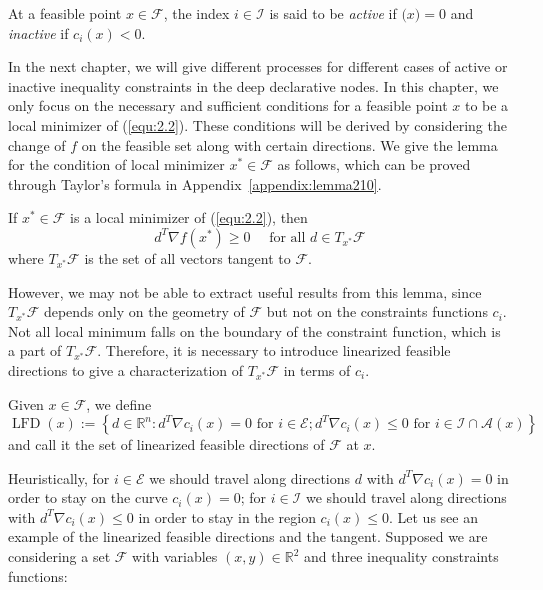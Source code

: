 \begin{defn}
    At a feasible point $x \in \mathscr{F}$, the index $i \in \mathscr{I}$ is said to be \emph{active} if $\mathscr(x) = 0$ and \emph{inactive} if $c_i(x) < 0$.  
\end{defn}
\par In the next chapter, we will give different processes for different cases of active or inactive inequality constraints in the deep declarative nodes. In this chapter, we only focus on the necessary and sufficient conditions for a feasible point $x$ to be a local minimizer of (\ref{equ:2.2}). These conditions will be derived by considering the change of $f$ on the feasible set along with certain directions. We give the lemma for the condition of local minimizer $x^* \in \mathscr{F}$ as follows, which can be proved through Taylor’s formula in Appendix~\ref{appendix:lemma210}.
\begin{lemma}
    \label{lemma:210}
    If $x^* \in \mathscr{F}$ is a local minimizer of (\ref{equ:2.2}), then
    $$
    d^{T} \nabla f\left(x^{*}\right) \geq 0 \quad \textrm { for all } d \in T_{x^{*}} \mathscr{F}
    $$
    where $T_{x^{*}} \mathscr{F}$ is the set of all vectors tangent to $\mathscr{F}$. 
\end{lemma}
\par However, we may not be able to extract useful results from this lemma, since $T_{x^{*}} \mathscr{F}$ depends only on the geometry of $\mathscr{F}$ but not on the constraints functions $c_i$. Not all local minimum falls on the boundary of the constraint function, which is a part of $T_{x^{*}} \mathscr{F}$. Therefore, it is necessary to introduce linearized feasible directions to give a characterization of $T_{x^{*}} \mathscr{F}$ in terms of $c_i$. 
\begin{defn}
    Given $x \in \mathscr{F}$, we define
    $$
    \operatorname{LFD}(x):=\left\{d \in \mathbb{R}^{n}: d^{T} \nabla c_{i}(x)=0 \text { for } i \in \mathscr{E} ; d^{T} \nabla c_{i}(x) \leq 0 \textrm { for } i \in \mathscr{I} \cap \mathscr{A}(x)\right\}
    $$
    and call it the set of linearized feasible directions of $\mathscr{F}$ at $x$. 
\end{defn}
\par Heuristically, for $i \in \mathscr{E}$ we should travel along directions $d$ with $d^{T} \nabla c_{i}(x)=0$ in order to stay on the curve $c_i(x)=0$; for $i \in \mathscr{I}$ we should travel along directions with $d^{T} \nabla c_{i}(x) \leq 0$ in order to stay in the region $c_i(x) \leq 0$. 
Let us see an example of the linearized feasible directions and the tangent. Supposed we are considering a set $\mathscr{F}$ with variables $(x,y) \in \mathbb{R}^2$ and three inequality constraints functions: 
